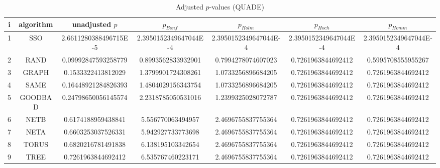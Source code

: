\documentclass[a4paper,10pt]{article}
\begin{document}
\begin{landscape}
\begin{table}[!htp]
\centering\scriptsize
\caption{Adjusted $p$-values (QUADE)}
\begin{tabular}{ccccccc}
i&algorithm&unadjusted $p$&$p_{Bonf}$&$p_{Holm}$&$p_{Hoch}$&$p_{Homm}$\\
\hline
1& SSO&2.6611280388496715E-5&2.3950152349647044E-4&2.3950152349647044E-4&2.3950152349647044E-4&2.3950152349647044E-4\\
2& RAND&0.09992847593258779&0.8993562833932901&0.7994278074607023&0.7261963844692412&0.5995708555955267\\
3& GRAPH&0.1533322413812029&1.3799901724308261&1.0733256896684205&0.7261963844692412&0.7261963844692412\\
4& SAME&0.16448921284826393&1.4804029156343754&1.0733256896684205&0.7261963844692412&0.7261963844692412\\
5& GOODBAD&0.24798650056145574&2.2318785050531016&1.2399325028072787&0.7261963844692412&0.7261963844692412\\
6& NETB&0.6174188959438841&5.556770063494957&2.4696755837755364&0.7261963844692412&0.7261963844692412\\
7& NETA&0.6603253037526331&5.942927733773698&2.4696755837755364&0.7261963844692412&0.7261963844692412\\
8& TORUS&0.6820216781491838&6.138195103342654&2.4696755837755364&0.7261963844692412&0.7261963844692412\\
9& TREE&0.7261963844692412&6.535767460223171&2.4696755837755364&0.7261963844692412&0.7261963844692412\\
\hline
\end{tabular}
\end{table}


\end{landscape}
\end{document}
